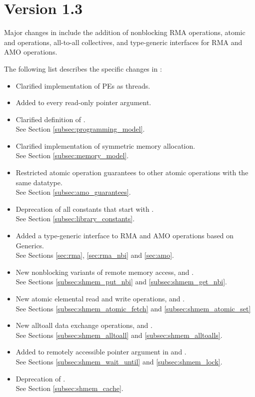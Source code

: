 \section{Version 1.3}
Major changes in \openshmem[1.3] include the addition of
nonblocking \ac{RMA} operations,
atomic \PUT{} and \GET{} operations,
all-to-all collectives,
and \Cstd[11] type-generic interfaces for \ac{RMA} and \ac{AMO} operations.

The following list describes the specific changes in \openshmem[1.3]:
\begin{itemize}
%
\item Clarified implementation of \acp{PE} as threads.
%
\item Added  to every read-only pointer argument.
%
\item Clarified definition of .
\\See Section \ref{subsec:programming_model}.
%
\item Clarified implementation of symmetric memory allocation.
\\See Section \ref{subsec:memory_model}.
%
\item Restricted atomic operation guarantees to other atomic operations with the same datatype.
\\See Section \ref{subsec:amo_guarantees}.
%
\item Deprecation of all constants that start with .
\\See Section \ref{subsec:library_constants}.
%
\item Added a type-generic interface to \openshmem \ac{RMA} and \ac{AMO}
	operations based on \Cstd[11] Generics.
\\See Sections \ref{sec:rma}, \ref{sec:rma_nbi} and \ref{sec:amo}.
%
\item New nonblocking variants of remote memory access, 
	and .
\\See Sections \ref{subsec:shmem_put_nbi} and \ref{subsec:shmem_get_nbi}.
%
\item New atomic elemental read and write operations,  and
	.
\\See Sections \ref{subsec:shmem_atomic_fetch} and \ref{subsec:shmem_atomic_set}
%
\item New alltoall data exchange operations, 
	and .
\\See Sections \ref{subsec:shmem_alltoall} and \ref{subsec:shmem_alltoalls}.
%
\item Added  to remotely accessible pointer argument in
	 and .
\\See Sections \ref{subsec:shmem_wait_until} and \ref{subsec:shmem_lock}.
%
\item Deprecation of .
\\See Section \ref{subsec:shmem_cache}.
%
\end{itemize}




